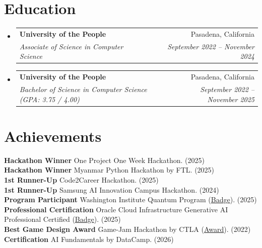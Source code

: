 \documentclass[letterpaper,11pt]{article}
\makeatletter
\newcommand{\resumeSubheading}[4]{
  \vspace{-2pt}\item
    \begin{tabular*}{0.97\textwidth}[t]{l@{\extracolsep{\fill}}r}
      \textbf{#1} & #2 \\
      \textit{\small#3} & \textit{\small #4} \\
    \end{tabular*}\vspace{-7pt}
}
\newcommand{\resumeSubHeadingListStart}{\begin{itemize}[leftmargin=0.15in, label={}]}
\newcommand{\resumeSubHeadingListEnd}{\end{itemize}}
\makeatother
\begin{document}
\section{Education}
  \resumeSubHeadingListStart
    \resumeSubheading
      {University of the People}
      {Pasadena, California}
      {Associate of Science in Computer Science}{September 2022 -- November 2024}

    \resumeSubheading
      {University of the People}
      {Pasadena, California}
      {Bachelor of Science in Computer Science (GPA: 3.75 / 4.00)}{September 2022 -- November 2025}
  \resumeSubHeadingListEnd


\section{Achievements}
\begin{itemize}[leftmargin=0.15in, label={}]
  \small{\item{
    \textbf{Hackathon Winner} One Project One Week Hackathon. (2025) \\
    \textbf{Hackathon Winner} Myanmar Python Hackathon by FTL. (2025) \\
    \textbf{1st Runner-Up} Code2Career Hackathon. (2025) \\
    \textbf{1st Runner-Up} Samsung AI Innovation Campus Hackathon. (2024) \\
    \textbf{Program Participant} Washington Institute Quantum Program
    (\href{https://www.virtualbadge.io/certificate-validator?credential=725114da-23f5-47d9-9dd9-ea03c4d92c22}{Badge}). (2025) \\
    \textbf{Professional Certification} Oracle Cloud Infrastructure Generative AI Professional Certified
    (\href{https://catalog-education.oracle.com/ords/certview/sharebadge?id=753729D85FEEF736CE86DD2066370E35D8C32304CBA3452395F9160D893B4D17}{Badge}). (2025) \\
    \textbf{Best Game Design Award} Game-Jam Hackathon  by CTLA
    (\href{https://drive.google.com/file/d/1nmCysvbXliY_4BossazKcHMeyta1N2XD/view?usp=sharing}{Award}). (2022)\\
    
    \textbf{Certification} AI
Fundamentals by DataCamp. (2026) \\

    
  }}
\end{itemize}



\end{document}
